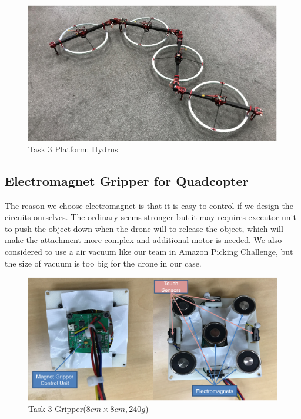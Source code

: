 \documentclass{standalone}
\begin{document}
 \begin{figure}%
    \begin{center}
      \includegraphics[clip, bb= 0 0 650 350, width=\columnwidth]{sections/task3/images/task3platform-hydrus.eps}
      \end{center}
    \caption{Task 3 Platform: Hydrus}
    \label{task3platform-hydrus}
    \end{figure}
    
    
\subsection{Electromagnet Gripper for Quadcopter}
The reason we choose electromagnet is that it is easy to control if we design the circuits ourselves. The ordinary seems stronger but it may requires executor unit to push the object down when the drone will to release the object, which will make the attachment more complex and additional motor is needed. We also considered to use a air vacuum like our team in Amazon Picking Challenge, but the size of vacuum is too big for the drone in our case. 
 \begin{figure}[hb]
    \begin{center}
    \includegraphics[keepaspectratio=true, width=1\linewidth, height=0.3\textheight]
    {sections//task3//images//task3gripper.png}
      \end{center}
    \caption{Task 3 Gripper($8cm \times 8cm, 240g$)}
    \label{task3platform}
    \end{figure}
\end{document}
